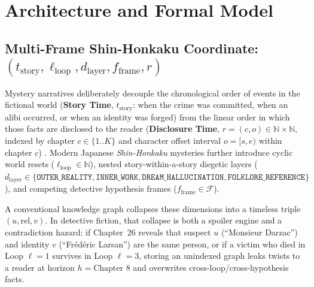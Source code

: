 \documentclass[11pt,twocolumn]{article}
\begin{document}
\section{Architecture and Formal Model}
\label{sec:architecture}

\subsection{\texorpdfstring{Multi-Frame Shin-Honkaku Coordinate: $(t_{\text{story}}, \ell_{\text{loop}}, d_{\text{layer}}, f_{\text{frame}}, r)$}{Multi-Frame Shin-Honkaku Coordinate}}
\label{sec:dual_timeline}

Mystery narratives deliberately decouple the chronological order of events in the fictional world (\textbf{Story Time}, $t_{\text{story}}$: when the crime was committed, when an alibi occurred, or when an identity was forged) from the linear order in which those facts are disclosed to the reader (\textbf{Disclosure Time}, $r = (c, o) \in \mathbb{N} \times \mathbb{N}$, indexed by chapter $c \in \{1..K\}$ and character offset interval $o = [s, e)$ within chapter $c$) \citep{boyd2023spoiler,kocisky2018narrativeqa}. Modern Japanese \textit{Shin-Honkaku} mysteries further introduce cyclic world resets ($\ell_{\text{loop}} \in \mathbb{N}$), nested story-within-a-story diegetic layers ($d_{\text{layer}} \in \{\texttt{OUTER\_REALITY}, \texttt{INNER\_WORK}, \texttt{DREAM\_HALLUCINATION}, \texttt{FOLKLORE\_REFERENCE}\}$), and competing detective hypothesis frames ($f_{\text{frame}} \in \mathcal{F}$).

A conventional knowledge graph \citep{iso5392_2024,bamman2019litbank} collapses these dimensions into a timeless triple $(u, \text{rel}, v)$. In detective fiction, that collapse is both a spoiler engine and a contradiction hazard: if Chapter~26 reveals that suspect $u$ (``Monsieur Darzac'') and identity $v$ (``Fr\'ed\'eric Larsan'') are the same person, or if a victim who died in Loop $\ell = 1$ survives in Loop $\ell = 3$, storing an unindexed graph leaks twists to a reader at horizon $h = \text{Chapter 8}$ and overwrites cross-loop/cross-hypothesis facts.
\end{document}
